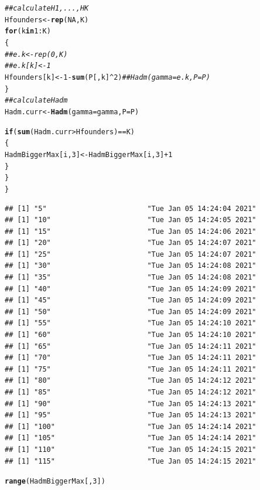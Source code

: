 \documentclass{article}\usepackage[]{graphicx}\usepackage[]{color}
\makeatletter
\newcommand{\hlnum}[1]{\textcolor[rgb]{0.686,0.059,0.569}{#1}}%
\newcommand{\hlcom}[1]{\textcolor[rgb]{0.678,0.584,0.686}{\textit{#1}}}%
\newcommand{\hlopt}[1]{\textcolor[rgb]{0,0,0}{#1}}%
\newcommand{\hlstd}[1]{\textcolor[rgb]{0.345,0.345,0.345}{#1}}%
\newcommand{\hlkwa}[1]{\textcolor[rgb]{0.161,0.373,0.58}{\textbf{#1}}}%
\newcommand{\hlkwb}[1]{\textcolor[rgb]{0.69,0.353,0.396}{#1}}%
\newcommand{\hlkwc}[1]{\textcolor[rgb]{0.333,0.667,0.333}{#1}}%
\newcommand{\hlkwd}[1]{\textcolor[rgb]{0.737,0.353,0.396}{\textbf{#1}}}%
\newenvironment{kframe}{%
 \def\at@end@of@kframe{}%
 \ifinner\ifhmode%
  \def\at@end@of@kframe{\end{minipage}}%
  \begin{minipage}{\columnwidth}%
 \fi\fi%
 \def\FrameCommand##1{\hskip\@totalleftmargin \hskip-\fboxsep
 \colorbox{shadecolor}{##1}\hskip-\fboxsep
     \hskip-\linewidth \hskip-\@totalleftmargin \hskip\columnwidth}%
 \MakeFramed {\advance\hsize-\width
   \@totalleftmargin\z@ \linewidth\hsize
   \@setminipage}}%
 {\par\unskip\endMakeFramed%
 \at@end@of@kframe}
\newenvironment{knitrout}{}{} %
\makeatother
\begin{document}
\begin{knitrout}
\begin{kframe}
\begin{alltt}
    \hlcom{##calculate H1, ..., HK}
    \hlstd{Hfounders} \hlkwb{<-} \hlkwd{rep}\hlstd{(}\hlnum{NA}\hlstd{, K)}
    \hlkwa{for}\hlstd{(k} \hlkwa{in} \hlnum{1}\hlopt{:}\hlstd{K)}
    \hlstd{\{}
      \hlcom{##e.k <- rep(0, K)}
      \hlcom{##e.k[k] <- 1}
      \hlstd{Hfounders[k]} \hlkwb{<-} \hlnum{1}\hlopt{-}\hlkwd{sum}\hlstd{(P[,k]}\hlopt{^}\hlnum{2}\hlstd{)}\hlcom{##Hadm(gamma=e.k, P=P)}
    \hlstd{\}}
    \hlcom{##calculate Hadm}
    \hlstd{Hadm.curr} \hlkwb{<-} \hlkwd{Hadm}\hlstd{(}\hlkwc{gamma}\hlstd{=gamma,} \hlkwc{P}\hlstd{=P)}

    \hlkwa{if}\hlstd{(}\hlkwd{sum}\hlstd{(Hadm.curr} \hlopt{>} \hlstd{Hfounders)} \hlopt{==} \hlstd{K)}
    \hlstd{\{}
      \hlstd{HadmBiggerMax[i,} \hlnum{3}\hlstd{]} \hlkwb{<-} \hlstd{HadmBiggerMax[i,} \hlnum{3}\hlstd{]} \hlopt{+} \hlnum{1}
    \hlstd{\}}
  \hlstd{\}}
\hlstd{\}}
\end{alltt}
\begin{verbatim}
## [1] "5"                        "Tue Jan 05 14:24:04 2021"
## [1] "10"                       "Tue Jan 05 14:24:05 2021"
## [1] "15"                       "Tue Jan 05 14:24:06 2021"
## [1] "20"                       "Tue Jan 05 14:24:07 2021"
## [1] "25"                       "Tue Jan 05 14:24:07 2021"
## [1] "30"                       "Tue Jan 05 14:24:08 2021"
## [1] "35"                       "Tue Jan 05 14:24:08 2021"
## [1] "40"                       "Tue Jan 05 14:24:09 2021"
## [1] "45"                       "Tue Jan 05 14:24:09 2021"
## [1] "50"                       "Tue Jan 05 14:24:09 2021"
## [1] "55"                       "Tue Jan 05 14:24:10 2021"
## [1] "60"                       "Tue Jan 05 14:24:10 2021"
## [1] "65"                       "Tue Jan 05 14:24:11 2021"
## [1] "70"                       "Tue Jan 05 14:24:11 2021"
## [1] "75"                       "Tue Jan 05 14:24:11 2021"
## [1] "80"                       "Tue Jan 05 14:24:12 2021"
## [1] "85"                       "Tue Jan 05 14:24:12 2021"
## [1] "90"                       "Tue Jan 05 14:24:13 2021"
## [1] "95"                       "Tue Jan 05 14:24:13 2021"
## [1] "100"                      "Tue Jan 05 14:24:14 2021"
## [1] "105"                      "Tue Jan 05 14:24:14 2021"
## [1] "110"                      "Tue Jan 05 14:24:15 2021"
## [1] "115"                      "Tue Jan 05 14:24:15 2021"
\end{verbatim}
\begin{alltt}
\hlkwd{range}\hlstd{(HadmBiggerMax[,} \hlnum{3}\hlstd{])}
\end{alltt}
\begin{verbatim}

\end{verbatim}
\end{kframe}
\end{knitrout}
\end{document}
